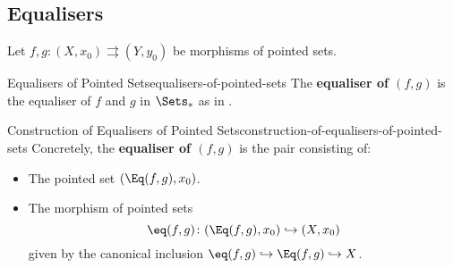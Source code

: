 \subsection{Equalisers}\label{subsection-equalisers-of-pointed-sets}
Let $f,g\colon(X,x_{0})\rightrightarrows(Y,y_{0})$ be morphisms of pointed sets.
\begin{definition}{Equalisers of Pointed Sets}{equalisers-of-pointed-sets}%
    The \textbf{equaliser of $(f,g)$} is the equaliser of $f$ and $g$ in $\Sets_{*}$ as in .
\end{definition}
\begin{construction}{Construction of Equalisers of Pointed Sets}{construction-of-equalisers-of-pointed-sets}%
    Concretely, the \textbf{equaliser of $(f,g)$} is the pair consisting of:
    \begin{itemize}
        \item{}The pointed set $(\Eq(f,g),x_{0})$.
        \item{}The morphism of pointed sets
            \[
                \eq(f,g)%
                \colon%
                (\Eq(f,g),x_{0})%
                \hookrightarrow%
                (X,x_{0})%
            \]%
            given by the canonical inclusion $\eq(f,g)\hookrightarrow\Eq(f,g)\hookrightarrow X$.
    \end{itemize}
\end{construction}

